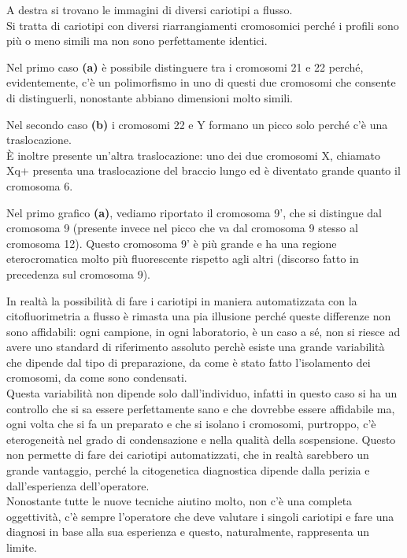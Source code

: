 \documentclass[11pt]{book}
\begin{document}
A destra si trovano le immagini di diversi cariotipi a flusso.\\
Si tratta di cariotipi con diversi riarrangiamenti cromosomici perché i profili sono più o meno simili ma non sono perfettamente identici. 

Nel primo caso \textbf{(a)} è possibile distinguere tra i cromosomi 21 e 22 perché, evidentemente, c’è un polimorfismo in uno di questi due cromosomi che consente di distinguerli, nonostante abbiano dimensioni molto simili.

Nel secondo caso \textbf{(b)} i cromosomi 22 e Y formano un picco solo perché c’è una traslocazione.\\
È inoltre presente un’altra traslocazione: uno dei due cromosomi X, chiamato Xq+ presenta una traslocazione del braccio lungo ed è diventato grande quanto il cromosoma 6.

Nel primo grafico \textbf{(a)}, vediamo riportato il cromosoma 9’, che si distingue dal cromosoma 9 (presente invece nel picco che va dal cromosoma 9 stesso al cromosoma 12). Questo cromosoma 9’ è più grande e ha una regione eterocromatica molto più fluorescente rispetto agli altri (discorso fatto in precedenza sul cromosoma 9).

In realtà la possibilità di fare i cariotipi in maniera automatizzata con la citofluorimetria a flusso è rimasta una pia illusione perché queste differenze non sono affidabili: ogni campione, in ogni laboratorio, è un caso a sé, non si riesce ad avere uno standard di riferimento assoluto perchè esiste una grande variabilità che dipende dal tipo di preparazione, da come è stato fatto l’isolamento dei cromosomi, da come sono condensati.\\
Questa variabilità non dipende solo dall’individuo, infatti in questo caso si ha un controllo che si sa essere perfettamente sano e che dovrebbe essere affidabile ma, ogni volta che si fa un preparato e che si isolano i cromosomi, purtroppo, c’è eterogeneità nel grado di condensazione e nella qualità della sospensione. 
Questo non permette di fare dei cariotipi automatizzati, che in realtà sarebbero un grande vantaggio, perché la citogenetica diagnostica dipende dalla perizia e dall’esperienza dell’operatore.\\
Nonostante tutte le nuove tecniche aiutino molto, non c’è una completa oggettività, c’è sempre l’operatore che deve valutare i singoli cariotipi e fare una diagnosi in base alla sua esperienza e questo, naturalmente, rappresenta un limite.
\end{document}
